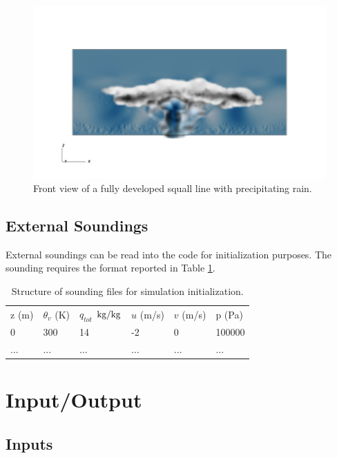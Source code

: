 \documentclass{report}
\begin{document}
\begin{figure}[htbp]
\includegraphics[width=1.2\textwidth]{figures/squall_working_warm_rain_frontal_view0028.png}
\caption{Front view of a fully developed squall line with precipitating rain. }
\label{fig:benchmarks/squall1}
\end{figure}

\section{External Soundings}
External soundings can be read into the code for initialization purposes. The sounding requires the format reported in Table \ref{tab:DeltaDefinitionsTable}.

\begin{table}[t]
\centering
{\footnotesize
\caption[short]{Structure of sounding files for simulation initialization.}
\label{tab:DeltaDefinitionsTable}
\begin{tabular*}{\textwidth}{ @{\extracolsep{\fill}} llllll}
\hline
\hline
z (m) & $\theta_v$ (K) & $q_{tot}$ $\rm {kg/kg}$ & $u$ (m/s) & $v$ (m/s) & p (Pa)\\
0 & 300 & 14  & -2 & 0 & 100000\\
... & ... & ...  & ... & ... & ...\\
\hline
\hline
\end{tabular*}
}
\end{table}

\chapter{Input/Output}
\section{Inputs}
\end{document}

